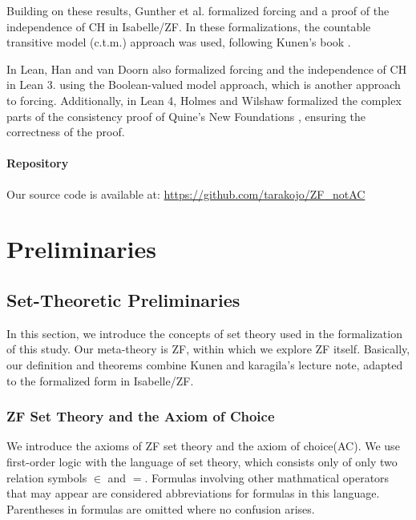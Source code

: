 \documentclass{report}
\newcommand{\ctm}{c.t.m.\ }
\begin{document}
Building on these results, Gunther et al. formalized forcing and a proof of the independence of CH \cite{gunther_forcing,gunther_independence} in Isabelle/ZF.
In these formalizations, the countable transitive model (c.t.m.) approach was used, following Kunen's book \cite{kunen2011}.

In Lean, Han and van Doorn also formalized forcing and the independence of CH \cite{flypitch} in Lean 3.
using the Boolean-valued model approach, which is another approach to forcing.
Additionally, in Lean 4, Holmes and Wilshaw formalized the complex parts of the consistency proof of Quine's New Foundations \cite{NF_consistency}, ensuring the correctness of the proof.



\begin{comment}
  section2-...で説明するように、\ctmの存在はconzfからは導けないが、正当性が言えるのです
\end{comment}

\subsubsection{Repository}
Our source code is available at: \url{https://github.com/tarakojo/ZF_notAC}

\chapter{Preliminaries}
\section{Set-Theoretic Preliminaries}
In this section, we introduce the concepts of set theory used in the formalization of this study.
Our meta-theory is ZF, within which we explore ZF itself. 
Basically, our definition and theorems combine Kunen\cite{kunen2011} and karagila's lecture note\cite{karagila},
adapted to the formalized form in Isabelle/ZF.


\subsection{ZF Set Theory and the Axiom of Choice}
We introduce the axioms of ZF set theory and the axiom of choice(AC).
We use first-order logic with the language of set theory, which consists only of only two relation symbols $\in$ and $=$. 
Formulas involving other mathmatical operators that may appear are considered abbreviations for formulas in this language.
Parentheses in formulas are omitted where no confusion arises.
\end{document}
